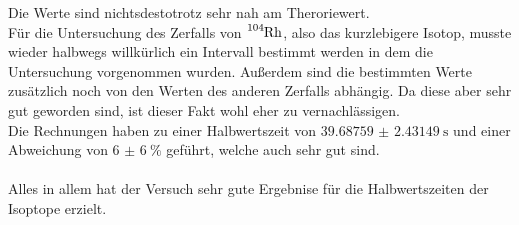 Die Werte sind nichtsdestotrotz sehr nah am Theroriewert.\\
Für die Untersuchung des Zerfalls von $\ce{^{104}_{}Rh}$, also das kurzlebigere Isotop, musste wieder halbwegs willkürlich ein Intervall bestimmt werden in dem die Untersuchung vorgenommen wurden.
Außerdem sind die bestimmten Werte zusätzlich noch von den Werten des anderen Zerfalls abhängig. Da diese aber sehr gut geworden sind, ist dieser Fakt wohl eher zu vernachlässigen.\\
Die Rechnungen haben zu einer Halbwertszeit von $\SI{39.68759(243149)}{\second}$ und einer Abweichung von $\SI{6(6)}{\percent}$ geführt, welche auch sehr gut sind.\\\\
Alles in allem hat der Versuch sehr gute Ergebnise für die Halbwertszeiten der Isoptope erzielt.
\newpage


